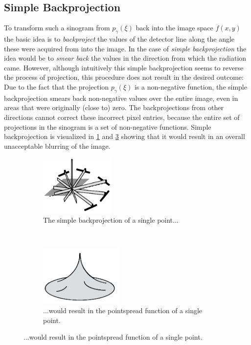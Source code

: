 \subsection{Simple Backprojection}
\par To transform such a sinogram from \(p_\gamma(\xi)\) back into the image space \(f(x,y)\) the basic idea is to \emph{backproject} the values of the detector line along the angle these were acquired from into the image. In the case of \emph{simple backprojection} the idea would be to \emph{smear back} the values in the direction from which the radiation came. However, although intuitively this simple backprojection seems to reverse the process of projection, this procedure does not result in the desired outcome: Due to the fact that the projection \(p_\gamma(\xi)\) is a non-negative
function, the simple backprojection smears back non-negative values over the entire image, even in areas that were originally (close to) zero. The backprojections from other directions cannot correct these incorrect pixel entries, because the entire set of projections in the sinogram is a set of non-negative functions. Simple backprojection is visualized in \ref{zeng1} and \ref{zeng2} showing that it would result in an overall unacceptable blurring of the image.\cite{buzug}
\begin{figure}[h!]
	\centering
	\begin{subfigure}[b]{0.5\textwidth}
		\centering
		\includegraphics[height=3cm]{images/zeng1_Shopped.png}
		\caption{The simple backprojection of a single point...\cite{zeng}}
		\label{zeng1}
	\end{subfigure}%
	~
	\begin{subfigure}[b]{0.5\textwidth}
		\centering
		\includegraphics[height=3cm]{images/zeng2_Shopped.png}
		\caption{...would result in the pointspread function of a single point.\cite{zeng}}
		\label{zeng2}
	\end{subfigure}%
\end{figure}
